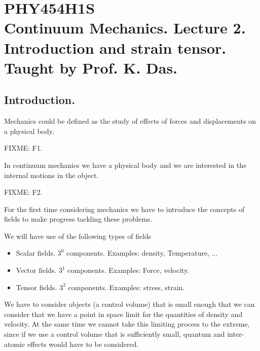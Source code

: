 
%

\chapter{PHY454H1S\\Continuum Mechanics.  Lecture 2.  Introduction and strain tensor.  Taught by Prof. K. Das.}
\label{chap:continuumL2}
{}
\date{Jan 13, 2012}

\beginArtWithToc

\section{Introduction.}

Mechanics could be defined as the study of effects of forces and displacements on a physical body.

FIXME: F1.

In continuum mechanics we have a physical body and we are interested in the internal motions in the object.  

FIXME: F2.

For the first time considering mechanics we have to introduce the concepts of fields to make progress tackling these problems.

We will have use of the following types of fields

\begin{itemize}
\item Scalar fields.  $3^0$ components.  Examples: density, Temperature, ...
\item Vector fields.  $3^1$ components.  Examples: Force, velocity.
\item Tensor fields.  $3^2$ components.  Examples: stress, strain.
\end{itemize}

We have to consider objects (a control volume) that is small enough that we can consider that we have a point in space limit for the quantities of density and velocity.  At the same time we cannot take this limiting process to the extreme, since if we use a control volume that is sufficiently small, quantum and inter-atomic effects would have to be considered.

